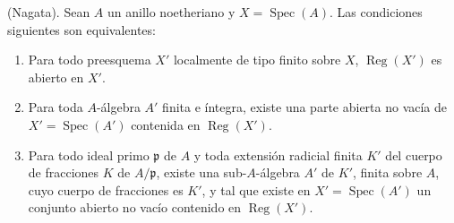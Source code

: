 \begin{theorem}[6.12.4]
\label{IV.2.s6.12.4-fr}
(Nagata). Sean $A$ un anillo noetheriano y
$X=\operatorname{Spec}(A)$. Las condiciones siguientes son equivalentes:
\begin{enumerate}
\item[\textup{a)}] Para todo preesquema $X'$ localmente de tipo finito sobre $X$,
$\operatorname{Reg}(X')$ es abierto en $X'$.
\item[\textup{b)}] Para toda $A$-álgebra $A'$ finita e íntegra, existe una
parte abierta no vacía de $X'=\operatorname{Spec}(A')$ contenida en
$\operatorname{Reg}(X')$.
\item[\textup{c)}] Para todo ideal primo $\mathfrak p$ de $A$ y toda extensión
radicial finita $K'$ del cuerpo de fracciones $K$ de $A/\mathfrak p$, existe
una sub-$A$-álgebra $A'$ de $K'$, finita sobre $A$, cuyo cuerpo de fracciones
es $K'$, y tal que existe en $X'=\operatorname{Spec}(A')$ un conjunto abierto
no vacío contenido en $\operatorname{Reg}(X')$.
\end{enumerate}
\end{theorem}
